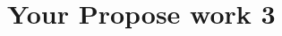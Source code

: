 \fancyhead[RE]{\fontsize{8}{12}\selectfont\leftmark}
\chapter{Your Propose work 3}
\label{pwork3}











